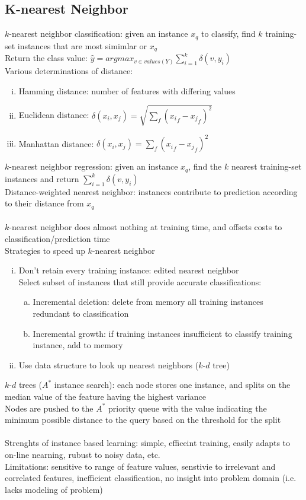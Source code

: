\documentclass{article}
\begin{document}
		\subsection{K-nearest Neighbor}
			$k$-nearest neighbor classification: given an instance $x_q$ to classify, find $k$ training-set instances that are most simimlar or $x_q$ \\
			Return the class value: $\hat{y} = argmax_{v \in values(Y)} \sum_{i = 1}^k \delta(v, y_i)$ \\
			Various determinations of distance: 
			\begin{enumerate}[(i)]
				\item Hamming distance: number of features with differing values
				\item Euclidean distance: $\delta(x_i, x_j) = \sqrt{\sum_f ({x_i}_f - {x_j}_f)^2}$
				\item Manhattan distance: $\delta(x_i, x_j) = \sum_f ({x_i}_f - {x_j}_f)^2$
				\end{enumerate}
			$k$-nearest neighbor regression: given an instance $x_q$, find the $k$ nearest training-set instances and return $\sum_{i = 1}^k \delta(v, y_i)$ \\
			Distance-weighted nearest neighbor: instances contribute to prediction according to their distance from $x_q$ \\
			\\
			$k$-nearest neighbor does almost nothing at training time, and offsets costs to classification/prediction time \\
			Strategies to speed up $k$-nearest neighbor
			\begin{enumerate}[(i)]
				\item Don't retain every training instance: edited nearest neighbor \\
				Select subset of instances that still provide accurate classifications: \\
				\begin{enumerate}[(a)]
					\item Incremental deletion: delete from memory all training instances redundant to classification
					\item Incremental growth: if training instances insufficient to classify training instance, add to memory
					\end{enumerate}
				\item Use data structure to look up nearest neighbors ($k$-$d$ tree)
				\end{enumerate}
			$k$-$d$ trees ($A^*$ instance search): each node stores one instance, and splits on the median value of the feature having the highest variance \\
			Nodes are pushed to the $A^*$ priority queue with the value indicating the minimum possible distance to the query based on the threshold for the split \\
			\\
			Strenghts of instance based learning: simple, efficeint training, easily adapts to on-line nearning, rubust to noisy data, etc. \\
			Limitations: sensitive to range of feature values, senstivie to irrelevant and correlated features, inefficient classification, no insight into problem domain (i.e. lacks modeling of problem)
\end{document}
